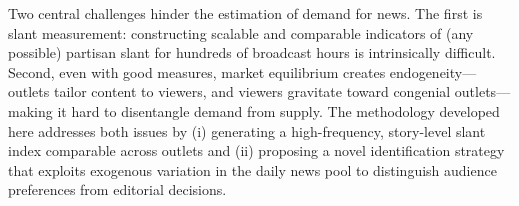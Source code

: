 \documentclass[12pt]{article}
\begin{document}
	
	
	
	
	
	
	
	
	
	
	
	Two central challenges hinder the estimation of demand for news. The first is slant measurement: constructing scalable and comparable indicators of (any possible) partisan slant for hundreds of broadcast hours is intrinsically difficult. Second, even with good measures, market equilibrium creates endogeneity—outlets tailor content to viewers, and viewers gravitate toward congenial outlets—making it hard to disentangle demand from supply. The methodology developed here addresses both issues by (i) generating a high-frequency, story-level slant index comparable across outlets and (ii) proposing a novel identification strategy that exploits exogenous variation in the daily news pool to distinguish audience preferences from editorial decisions.
	
\end{document}
